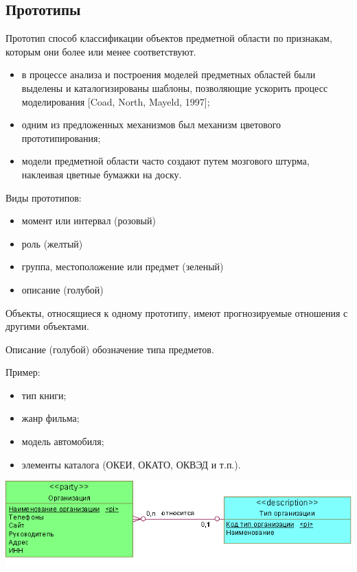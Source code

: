 \documentclass{beamer}
\begin{document}
\subsection{Прототипы}
\begin{frame}
\begin{block}{Прототип}
способ классификации объектов предметной области по признакам, которым они более или менее соответствуют.
\end{block}
\begin{itemize}
\item в процессе анализа и построения моделей предметных областей были выделены и каталогизированы шаблоны, позволяющие ускорить процесс моделирования [Coad, North, Mayeld, 1997];
\item одним из предложенных механизмов был механизм цветового прототипирования;
\item модели предметной области часто создают путем мозгового штурма, наклеивая цветные бумажки на доску.
\end{itemize}
Виды прототипов:
\begin{itemize}
\item момент или интервал (розовый)
\item роль (желтый)
\item группа, местоположение или предмет (зеленый)
\item описание (голубой)
\end{itemize}
Объекты, относящиеся к одному прототипу, имеют прогнозируемые отношения с другими объектами.
\end{frame}

\begin{frame}
\begin{block}{Описание (голубой)}
обозначение типа предметов. 
\end{block}
Пример:
\begin{itemize}
\item тип книги;
\item жанр фильма;
\item модель автомобиля;
\item элементы каталога (ОКЕИ, ОКАТО, ОКВЭД и т.п.).
\end{itemize}
\begin{center}
\includegraphics[scale=0.5]{images/lec03-pic05.png}
\end{center}
\end{frame}
\end{document}
